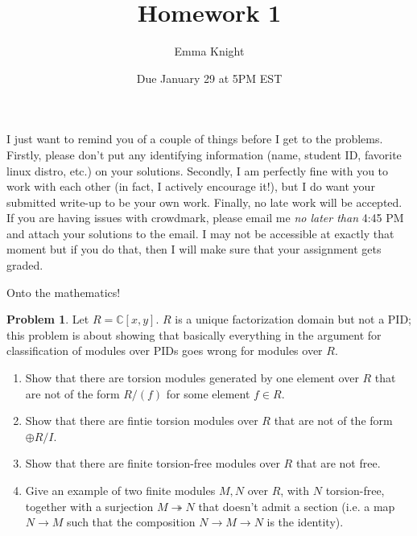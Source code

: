 \documentclass[11pt]{article}
\title{Homework 1}
\author{Emma Knight}
\date{Due January 29 at 5PM EST}
\theoremstyle{definition}
\newtheorem{problem}[theorem]{Problem}
\theoremstyle{definition}
\newcommand{\C}{\mathbb{C}}
\begin{document}
\maketitle
I just want to remind you of a couple of things before I get to the problems.  Firstly, please don't put any identifying information (name, student ID, favorite linux distro, etc.) on your solutions.  Secondly, I am perfectly fine with you to work with each other (in fact, I actively encourage it!), but I do want your submitted write-up to be your own work.  Finally, no late work will be accepted.  If you are having issues with crowdmark, please email me \emph{no later than} 4:45 PM and attach your solutions to the email.  I may not be accessible at exactly that moment but if you do that, then I will make sure that your assignment gets graded.

Onto the mathematics!
\begin{problem}
Let $R = \C[x, y]$.  $R$ is a unique factorization domain but not a PID; this problem is about showing that basically everything in the argument for classification of modules over PIDs goes wrong for modules over $R$.
\begin{enumerate}[label=(\alph*)]
\item Show that there are torsion modules generated by one element over $R$ that are not of the form $R/(f)$ for some element $f \in R$.
\item Show that there are fintie torsion modules over $R$ that are not of the form $\oplus R/I$.
\item Show that there are finite torsion-free modules over $R$ that are not free.
\item Give an example of two finite modules $M, N$ over $R$, with $N$ torsion-free, together with a surjection $M \twoheadrightarrow N$ that doesn't admit a section (i.e. a map $N \rightarrow M$ such that the composition $N \rightarrow M \rightarrow N$ is the identity).
\end{enumerate}
\end{problem}
\end{document}
